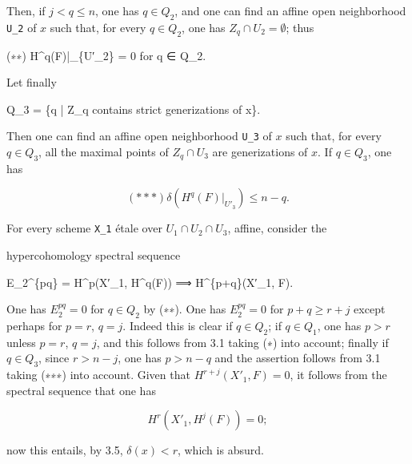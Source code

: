 \documentclass[
  11pt,
  a4paper,
]{book}
\newenvironment{Shaded}{}{}
\newcommand{\NormalTok}[1]{#1}
\begin{document}
Then, if \(j < q \leqslant n\), one has \(q \in Q_{2}\), and one can
find an affine open neighborhood \texttt{U\_2} of \(x\) such that, for
every \(q \in Q_{2}\), one has \(Z_{q} \cap U_{2} = \emptyset\); thus

\begin{Shaded}
\begin{Highlighting}[]
\NormalTok{(∗∗)   H\^{}q(F)|\_\{U′\_2\} = 0 for q ∈ Q\_2.}
\end{Highlighting}
\end{Shaded}

Let finally

\begin{Shaded}
\begin{Highlighting}[]
\NormalTok{Q\_3 = \{q | Z\_q contains strict generizations of x\}.}
\end{Highlighting}
\end{Shaded}

Then one can find an affine open neighborhood \texttt{U\_3} of \(x\)
such that, for every \(q \in Q_{3}\), all the maximal points of
\(Z_{q} \cap U_{3}\) are generizations of \(x\). If \(q \in Q_{3}\), one
has

\[ (\ast\ast\ast) \delta(H^{q}(F)|_{U'_{3}}) \leqslant n - q. \]

For every scheme \texttt{X\_1} étale over
\(U_{1} \cap U_{2} \cap U_{3}\), affine, consider the

hypercohomology spectral sequence

\begin{Shaded}
\begin{Highlighting}[]
\NormalTok{E\_2\^{}\{pq\} = H\^{}p(X′\_1, H\^{}q(F)) ⟹ H\^{}\{p+q\}(X′\_1, F).}
\end{Highlighting}
\end{Shaded}

One has \(E^{pq}_{2} = 0\) for \(q \in Q_{2}\) by (∗∗). One has
\(E^{pq}_{2} = 0\) for \(p + q \geqslant r + j\) except perhaps for
\(p = r\), \(q = j\). Indeed this is clear if \(q \in Q_{2}\); if
\(q \in Q_{1}\), one has \(p > r\) unless \(p = r\), \(q = j\), and this
follows from 3.1 taking (∗) into account; finally if \(q \in Q_{3}\),
since \(r > n - j\), one has \(p > n - q\) and the assertion follows
from 3.1 taking (∗∗∗) into account. Given that
\(H^{r+j}(X'_{1}, F) = 0\), it follows from the spectral sequence that
one has

\[ H^{r}(X'_{1}, H^{j}(F)) = 0; \]

now this entails, by 3.5, \(\delta(x) < r\), which is absurd.
\end{document}

